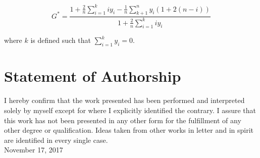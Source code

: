 \documentclass[a4paper,12pt,legno]{article}
\begin{document}
\begin{equation*}
G^{*} = \frac{1+\frac{2}{n}\sum_{i=1}^k iy_{i} - \frac{1}{n}\sum_{k+1}^n y_{i}(1+2(n-i))}{1+\frac{2}{n}\sum_{i=1}^k iy_{i}}
\end{equation*}

where $k$ is defined such that $\sum_{i=1}^k y_{i} = 0$.

\newpage



\section*{Statement of Authorship}
I hereby confirm that the work presented has been performed and interpreted solely by myself except for where I explicitly identified the contrary. I assure that this work has not been presented in any other form for the fulfillment of any other degree or qualification. Ideas taken from other works in letter and in spirit are identified in every single case.
\\[1in] November 17, 2017
\end{document}
